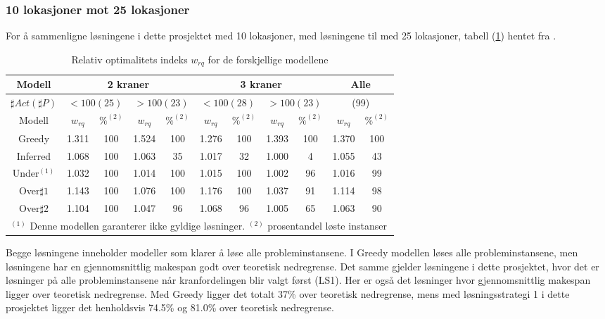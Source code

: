 \subsubsection{10 lokasjoner mot 25 lokasjoner}
For å sammenligne løsningene i dette prosjektet med 10 lokasjoner, med løsningene til \bht med 25 lokasjoner, tabell (\ref{tab:resultaterSumTvedt}) hentet fra \cite{tvedtbezem}.
\begin{table}[!h]
\caption{Relativ optimalitets indeks $w_{rq}$ for de forskjellige modellene}
\begin{center}
\begin{tabular}{ | c | c | c | c | c | c | c | c | c | c | c | }
\hline
\textbf{Modell} & \multicolumn{4}{|c|}{\textbf{2 kraner}} & \multicolumn{4}{|c|}{\textbf{3 kraner}} & \multicolumn{2}{|c|}{\textbf{Alle}} \\ \hline
$\sharp Act(\sharp P)$ & \multicolumn{2}{|c|}{$< 100 (25)$} & \multicolumn{2}{|c|}{$> 100 (23)$} & \multicolumn{2}{|c|}{$< 100 (28)$} & \multicolumn{2}{|c|}{$> 100 (23)$} & \multicolumn{2}{|c|}{(99)} \\ 
\hline
Modell & $w_{rq}$ & $\%^{(2)}$ & $w_{rq}$ & $\%^{(2)}$  & $w_{rq}$ & $\%^{(2)}$ & $w_{rq}$ & $\%^{(2)}$ & $w_{rq}$ & $\%^{(2)}$ \\ \hline
Greedy & 1.311 & 100 & 1.524 & 100 & 1.276 & 100 & 1.393 & 100 & 1.370 & 100 \\
Inferred & 1.068 & 100 & 1.063 & 35 & 1.017 & 32 & 1.000 & 4 & 1.055 & 43 \\
Under$^{(1)}$ & 1.032 & 100 & 1.014 & 100 & 1.015 & 100 & 1.002 & 96 & 1.016 & 99 \\
Over$\sharp 1$ & 1.143 & 100 & 1.076 & 100 & 1.176 & 100 & 1.037 & 91 & 1.114 & 98 \\
Over$\sharp 2$ & 1.104 & 100 & 1.047 & 96 & 1.068 & 96 & 1.005 & 65 & 1.063 & 90 \\
\hline
\multicolumn{11}{l}{\begin{minipage}{6in}$^{(1)}$ Denne modellen garanterer ikke gyldige løsninger.
$^{(2)}$ prosentandel løste instanser \end{minipage}}
\end{tabular}
\end{center}
\label{tab:resultaterSumTvedt}
\end{table}
Begge løsningene inneholder modeller som klarer å løse alle probleminstansene. I Greedy modellen løses alle probleminstansene, men løsningene har en gjennomsnittlig makespan godt over teoretisk nedregrense. Det samme gjelder løsningene i dette prosjektet, hvor det er løsninger på alle probleminstansene når kranfordelingen blir valgt først (LS1). Her er også det løsninger hvor gjennomsnittlig makespan ligger over teoretisk nedregrense. Med Greedy ligger det totalt 37\% over teoretisk nedregrense, mens med løsningsstrategi 1 i dette prosjektet ligger det henholdsvis 74.5\% og 81.0\% over teoretisk nedregrense.

